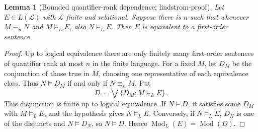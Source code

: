 \documentclass[UTF8,11pt]{ctexart}
\newtheorem*{lemma}{Lemma}
\theoremstyle{definition}
\begin{document}
\begin{lemma}[Bounded quantifier-rank dependence; lindstrom-proof]
Let $E\in L(\mathcal L)$ with $\mathcal L$ finite and relational.
Suppose there is $n$ such that whenever $M\equiv_nN$ and
$M\models_LE$, also $N\models_LE$. Then $E$ is equivalent to a
first-order sentence.
\end{lemma}
\begin{proof}
Up to logical equivalence there are only finitely many first-order
sentences of quantifier rank at most $n$ in the finite language.
For a fixed $M$, let $D_M$ be the conjunction of those true in $M$,
choosing one representative of each equivalence class. Thus
$N\models D_M$ if and only if $N\equiv_nM$.
Put
\[
D=\bigvee\{D_M:M\models_LE\}.
\]
This disjunction is finite up to logical equivalence.
If $N\models D$, it satisfies some $D_M$ with $M\models_LE$, and the
hypothesis gives $N\models_LE$. Conversely, if $N\models_LE$,
$D_N$ is one of the disjuncts and $N\models D_N$, so $N\models D$.
Hence $\operatorname{Mod}_L(E)=\operatorname{Mod}(D)$.
\end{proof}
\end{document}
